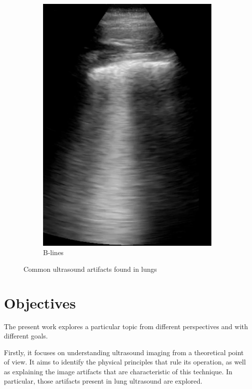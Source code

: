 \documentclass[11pt]{article} %
\begin{document}
\begin{figure}[h]
\begin{subfigure}{0.3\textwidth}
		\includegraphics[width=\textwidth]{figuras/blines.jpg}
		\caption{B-lines}
		\end{subfigure}	
	\caption{Common ultrasound artifacts found in lungs}	
	\end{figure}
	


\section{Objectives}

	The present work explores a particular topic from different perspectives and with different goals.

	Firstly, it focuses on understanding ultrasound imaging from a theoretical point of view. It aims to identify the physical principles that rule its operation, as well as explaining the image artifacts that are characteristic of this technique. In particular, those artifacts present in lung ultrasound are explored.
	
\end{document}
